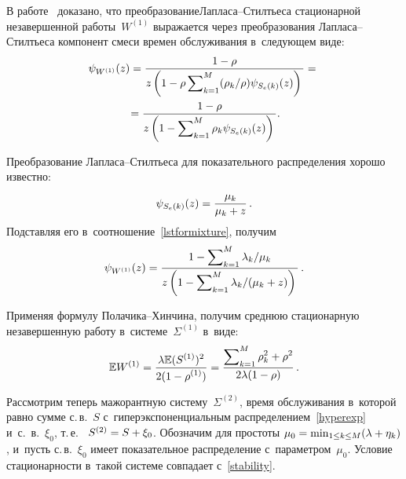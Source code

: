 \begin{multicols}{2}
В работе~\cite{mathematics2022} доказано, что преобразование\linebreak Лап\-ла\-са--Стилть\-еса 
стационарной незавершенной работы~$W^{(1)}$ выражается через преобразования 
Лап\-ла\-са--Стилть\-еса компонент смеси времен обслуживания в~сле\-ду\-ющем виде:
\begin{multline}
\label{lstformixture}
\psi_{W^{(1)}}(z)=\displaystyle\frac{\displaystyle 1-\rho\mathstrut}{\displaystyle z\left(1-\rho\sum\nolimits_{k=1}^M 
(\rho_k/{\rho}) \psi_{S_e(k)}(z)\right)\mathstrut}={}\\
{}=\displaystyle\frac{\displaystyle 1-\rho\mathstrut}{\displaystyle z\left(1-
\sum\nolimits_{k=1}^M \rho_k \psi_{S_e(k)}(z)\right)\mathstrut}.
\end{multline}

Преобразование Лапласа--Стилть\-еса для показательного распределения хорошо 
известно: 
$$
\psi_{S_e(k)}(z) = \displaystyle\frac{\displaystyle \mu_k\mathstrut}{\displaystyle \mu_k +z\mathstrut}\,.
$$ 
Подставляя его в~соотношение~\eqref{lstformixture},  получим
$$
\psi_{W^{(1)}}(z)=\displaystyle\frac{\displaystyle 1-\sum\nolimits_{k=1}^M \lambda_k/\mu_k\mathstrut}{\displaystyle z\left(1-
\sum\nolimits_{k=1}^M  {\lambda_k}/(\mu_k +z)   
\right)\mathstrut}\,.
$$

Применяя формулу По\-ла\-чи\-ка--Хин\-чи\-на, получим среднюю стационарную незавершенную 
работу  в~сис\-те\-ме~$\Sigma^{(1)}$ в~виде:
\begin{equation}
\label{ew5}
\mathbb{E}  W^{(1)} = \displaystyle\frac{\displaystyle \lambda \mathbb{E} ( S^{(1)})^2\mathstrut}{\displaystyle 2(1-\rho^{(1)})\mathstrut} = 
\displaystyle\frac{\displaystyle \sum\nolimits_{k=1}^M \rho_k^2 +\rho^2\mathstrut}{\displaystyle 2\lambda (1-\rho)\mathstrut}\,.
\end{equation}


Рассмотрим теперь мажорантную сис\-те\-му~$\Sigma^{(2)}$,  время обслуживания 
в~которой равно сумме с.\,в.~$S$ с~гиперэкспоненциальным распределением~\eqref{hyperexp} и~с.~в.~$\xi_0$, т.\,е.\
 $\ S^{(2)}\hm=S \hm+ \xi_0$. Обозначим для простоты 
$\mu_0\hm=\min\nolimits_{1\le k\le M} (\lambda\hm+\eta_k)$, и~пусть с.\,в.~$\xi_0$ имеет 
показательное распределение  с~па\-ра\-мет\-ром~$\mu_0$. Условие стационарности 
в~такой сис\-те\-ме совпадает с~\eqref{stability}.


\end{multicols}
